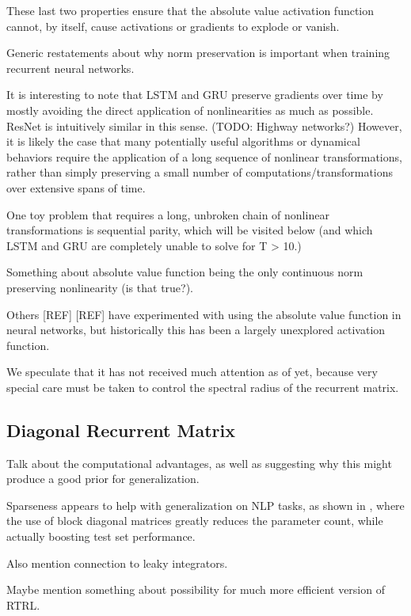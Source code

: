\documentclass{article}
\begin{document}
These last two properties ensure that the absolute value activation function cannot, by itself, cause activations or gradients to explode or vanish.

Generic restatements about why norm preservation is important when training recurrent neural networks.

It is interesting to note that LSTM and GRU preserve gradients over time by mostly avoiding the direct application of nonlinearities as much as possible. ResNet is intuitively similar in this sense. (TODO: Highway networks?) However, it is likely the case that many potentially useful algorithms or dynamical behaviors require the application of a long sequence of nonlinear transformations, rather than simply preserving a small number of computations/transformations over extensive spans of time.

One toy problem that requires a long, unbroken chain of nonlinear transformations is sequential parity, which will be visited below (and which LSTM and GRU are completely unable to solve for T > 10.)
 


Something about absolute value function being the only continuous norm preserving nonlinearity (is that true?).

Others [REF] [REF] have experimented with using the absolute value function in neural networks, but historically this has been a largely unexplored activation function.

We speculate that it has not received much attention as of yet, because very special care must be taken to control the spectral radius of the recurrent matrix.

\subsection{Diagonal Recurrent Matrix}

Talk about the computational advantages, as well as suggesting why this might produce a good prior for generalization.

Sparseness appears to help with generalization on NLP tasks, as shown in \citet{2018arXiv180808720D}, where the use of block diagonal matrices greatly reduces the parameter count, while actually boosting test set performance.

Also mention connection to leaky integrators.

Maybe mention something about possibility for much more efficient version of RTRL.
\end{document}
